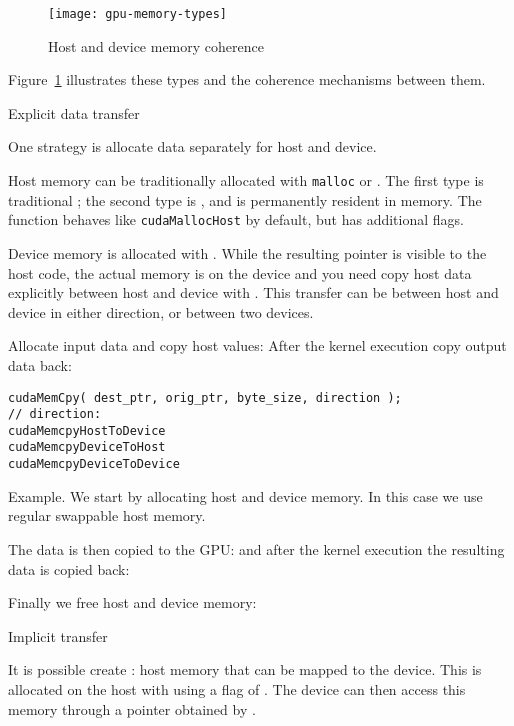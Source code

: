 \begin{figure}[ht]
  \texttt{[image: gpu-memory-types]}
  \caption{Host and device memory coherence}
  \label{fig:cu-memory-types}
\end{figure}
Figure~\ref{fig:cu-memory-types} illustrates these types
and the coherence mechanisms between them.

 {Explicit data transfer}

One strategy is allocate data separately for host and device.

Host memory can be traditionally allocated with \lstinline{malloc}
or .
The first type is traditional ;
the second type is ,
and is permanently resident in memory.
The function  behaves like \lstinline{cudaMallocHost}
by default, but has additional flags.

Device memory is allocated with .
While the resulting pointer is visible to the host code,
the actual memory is on the device and you need copy host data explicitly
between host and device with .
This transfer can be between host and device in either direction,
or between two devices.

Allocate input data and copy host values:
After the kernel execution copy output data back:

\begin{lstlisting}
cudaMemCpy( dest_ptr, orig_ptr, byte_size, direction );
// direction:
cudaMemcpyHostToDevice
cudaMemcpyDeviceToHost
cudaMemcpyDeviceToDevice
\end{lstlisting}

Example. We start by allocating host and device memory.
In this case we use regular swappable host memory.

The data is then copied to the \ac{GPU}:
and after the kernel execution the resulting data is copied back:

Finally we free host and device memory:

 {Implicit transfer}

It is possible create :
host memory that can be mapped to the device.
This is allocated on the host with 
using a flag of .
The device can then access this memory through a pointer
obtained by .


